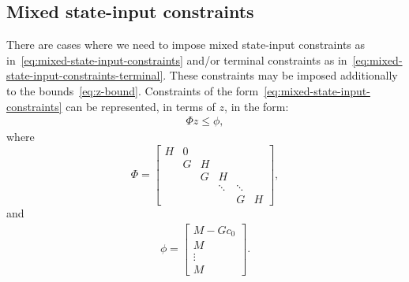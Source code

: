 \documentclass[12pt]{scrartcl}
\begin{document}
\subsection*{Mixed state-input constraints}
There are cases where we need to impose mixed state-input constraints 
as in~\eqref{eq:mixed-state-input-constraints} and/or
terminal constraints as in~\eqref{eq:mixed-state-input-constraints-terminal}.
These constraints may be imposed additionally to the bounds~\eqref{eq:z-bound}.
Constraints of the form~\eqref{eq:mixed-state-input-constraints} can be 
represented, in terms of $z$, in the form:
\begin{align}
\Phi z \leq \phi,
\end{align}
where
\begin{equation}
\Phi=\left[\begin{array}{cccccc}
H & 0\\
& G  & H\\
&& G & H \\
&&& \ddots & \ddots\\
&&&& G & H
\end{array}\right],
\end{equation}
and
\begin{align}
\phi=\left[ \begin{array}{c}
M-Gc_0\\
M\\
\vdots\\
M
\end{array}\right].
\end{align}
\end{document}
